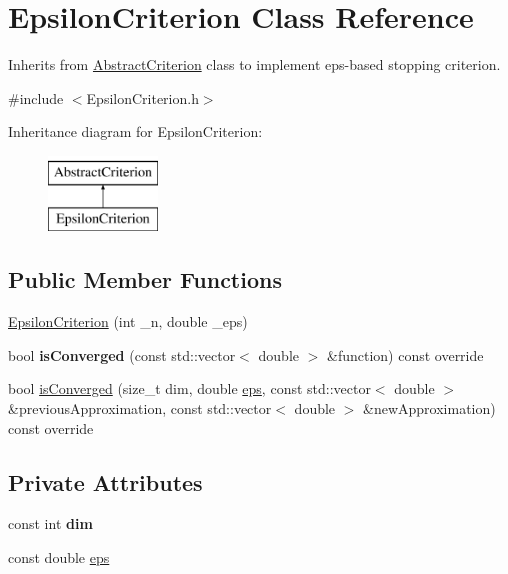 \hypertarget{class_epsilon_criterion}{}\section{Epsilon\+Criterion Class Reference}
\label{class_epsilon_criterion}


Inherits from \hyperlink{class_abstract_criterion}{Abstract\+Criterion} class to implement eps-\/based stopping criterion.  




{\ttfamily \#include $<$Epsilon\+Criterion.\+h$>$}

Inheritance diagram for Epsilon\+Criterion\+:\begin{figure}[H]
\begin{center}
\leavevmode
\includegraphics[height=2.000000cm]{class_epsilon_criterion}
\end{center}
\end{figure}
\subsection*{Public Member Functions}
\begin{DoxyCompactItemize}
\item 
\hyperlink{class_epsilon_criterion_a0f84f83305ad598ca5d5458de648fbc3}{Epsilon\+Criterion} (int \+\_\+n, double \+\_\+eps)
\item 
\mbox{\label{class_epsilon_criterion_a91397b5d4bb8651a6d8f5294df39f26a}} 
bool {\bfseries is\+Converged} (const std\+::vector$<$ double $>$ \&function) const override
\item 
bool \hyperlink{class_epsilon_criterion_a3e548b8cc84db57deb00708b1c361604}{is\+Converged} (size\+\_\+t dim, double \hyperlink{class_epsilon_criterion_aa681adfcb498dadf5f2a5857940d535f}{eps}, const std\+::vector$<$ double $>$ \&previous\+Approximation, const std\+::vector$<$ double $>$ \&new\+Approximation) const override
\end{DoxyCompactItemize}
\subsection*{Private Attributes}
\begin{DoxyCompactItemize}
\item 
\mbox{\label{class_epsilon_criterion_aace3bbafc317c894fb7eda51754ae0ef}} 
const int {\bfseries dim}
\item 
const double \hyperlink{class_epsilon_criterion_aa681adfcb498dadf5f2a5857940d535f}{eps}
\end{DoxyCompactItemize}


